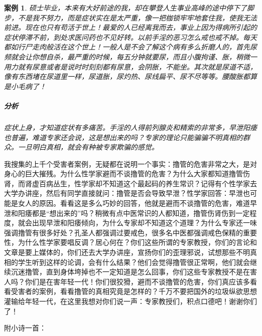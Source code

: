 \documentclass[fontset=founder]{ctexart}
\newtheorem{case}{案例}
\begin{document}
\begin{case}
    硕士毕业，本来有大好前途的我，却在攀登人生事业高峰的途中停下了脚步，不是我不努力，而是症状实在是太严重，像一把枷锁牢牢地套住我，使我无法前进。现在也只有苟活于世上！最爱的人已经离我而去，事业上因为得病所引起的症状停滞不前，到处求医问药也不见好转。以前手淫的恶习怎么戒也戒不掉。每天都如行尸走肉般活在这个世上！一般人是不会了解这个病有多么折磨人的，首先尿频就会让你想自杀，最严重的时候，每五分钟就要尿，而且小腹拘谨、胀，稍微一用力就有尿意或者是说时时刻刻都有尿意，会阴胀，不能坐。其次就是尿道不适，像有东西堵在尿道里一样，尿道胀，尿灼热、尿线扁平、尿不尽等等。腰酸胀都算是小毛病了！
    \subparagraph{分析} 症状上身，才知道症状有多痛苦。手淫的人得前列腺炎和精索的非常多，早泄阳痿也普遍，难道专家还会说，这是想出来的吗？专家的理论只能骗骗不明真相的群众。一旦明白真相，就会有种被专家欺骗的感觉。
\end{case}

我搜集的上千个受害者案例，无疑都在说明一个事实：撸管的危害非常之大，是对身心的巨大摧残。为什么性学家避而不谈撸管的危害？为什么大家都知道撸管伤肾，而肾虚百病丛生，性学家却不知道这个最起码的养生常识？记得有个性学家去大学办讲座，然后有同学直接就问：撸管是否会导致早泄？性学家回答：早泄也可能是女人的原因。看看这是多么巧妙的回答，他就是避而不谈撸管的危害，难道早泄和阳痿都是“想出来的”吗？稍微有点中医常识的人都知道，撸管伤肾伤到一定程度，就会出现早泄和阳痿倾向，为什么专家却不知道这个道理？为什么专家还一味强调撸管有很多好处？孔圣人都强调过要戒色，很多名中医都强调戒色保精的重要性，为什么性学家要唱反调？居心何在？你们这些所谓的专家教授，你们的言论和文章是要上媒体的，你们还去大学办讲座，宣扬你们的歪理邪说，试想那些不明真相的学生听到这样的论调，会有什么结果？他们会觉得撸管很正常啊，他们就会继续沉迷撸管，直到身体垮掉也不一定知道是怎么回事，你们这些专家教授不是在害人吗？你们是在害年轻一代！你们很狡猾，避而不谈撸管的危害，你们真应该多看看受害者的案例，看看撸管的真相究竟是怎样的？千万不要把国外的垃圾纵欲思想灌输给年轻一代，在这里我想对你们说一声：专家教授们，积点口德吧！谢谢你们了！

附小诗一首：
\end{document}
